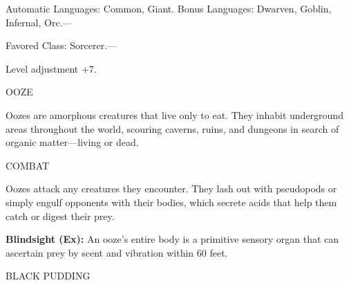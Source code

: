 \documentclass{article}
\begin{document}
Automatic Languages: Common, Giant. Bonus Languages: Dwarven, Goblin, Infernal, 
Orc.---

Favored Class: Sorcerer.---

Level adjustment +7.

\vspace{12pt}
{\LARGE{}OOZE}

Oozes are amorphous creatures that live only to eat. They inhabit underground areas 
throughout the world, scouring caverns, ruins, and dungeons in search of organic 
matter---living or dead.

COMBAT

Oozes attack any creatures they encounter. They lash out with pseudopods or simply 
engulf opponents with their bodies, which secrete acids that help them catch or 
digest their prey.

\textbf{Blindsight (Ex): }An ooze's entire body is a primitive sensory organ that 
can ascertain prey by scent and vibration within 60 feet.

\vspace{12pt}
BLACK PUDDING
\end{document}
